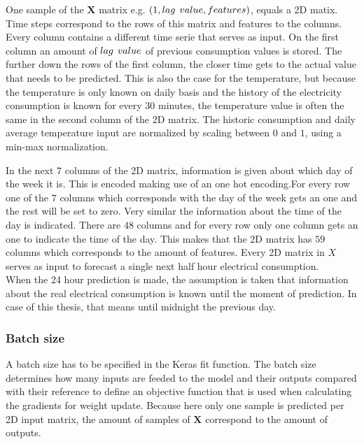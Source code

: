 One sample of the $ \bm{X} $ matrix e.g. $ (1,lag\hspace{1.5mm}value, features) $, equals a 2D matix. Time steps correspond to the rows of this matrix and features to the columns. Every column contains a different time serie that serves as input. On the first column an amount of $ lag\hspace{1.5mm}value $ of previous consumption values is stored. The further down the rows of the first column, the closer time gets to the actual value that needs to be predicted. This is also the case for the temperature, but because the temperature is only known on daily basis and the history of the electricity consumption is known for every 30 minutes, the temperature value is often the same in the second column of the 2D matrix. The historic consumption and daily average temperature input are normalized by scaling between $ 0 $ and $ 1 $, using a min-max normalization.

In the next $ 7 $ columns of the 2D matrix, information is given about which day of the week it is. This is encoded making use of an one hot encoding.For every row one of the $ 7 $ columns which corresponds with the day of the week gets an one and the rest will be set to zero. Very similar the information about the time of the day is indicated. There are $ 48 $ columns and for every row only one column gets an one to indicate the time of the day. This makes that the 2D matrix has $ 59  $ columns which corresponds to the amount of features. Every 2D matrix in $ X $ serves as input to forecast a single next half hour electrical consumption.\\

When the 24 hour prediction is made, the assumption is taken that information about the real electrical consumption is known until the moment of prediction. In case of this thesis, that means until midnight the previous day. 

\subsubsection{Batch size}
A batch size has to be specified in the Keras fit function. The batch size determines how many inputs are feeded to the model and their outputs compared with their reference to define an objective function that is used when calculating the gradients for weight update. Because here only one sample is predicted per 2D input matrix, the amount of samples of $ \bm{X} $ correspond to the amount of outputs.\\

